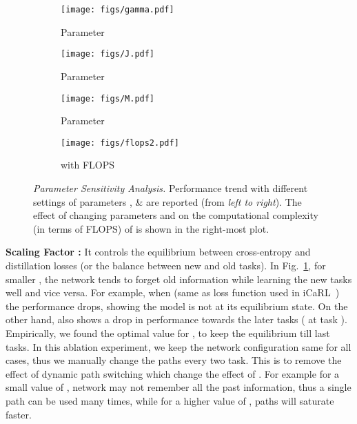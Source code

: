\begin{figure*}[!htb]
    \centering
    \begin{subfigure}{.245\textwidth}
        \centering
            \texttt{[image: figs/gamma.pdf]}
        \caption{Parameter }\label{fig:gamma}
    \end{subfigure}
    \begin{subfigure}{.245\textwidth}
        \centering
        \texttt{[image: figs/J.pdf]}
        \caption{Parameter }\label{fig:j_var}
    \end{subfigure}
    \begin{subfigure}{.245\textwidth}
        \centering
        \texttt{[image: figs/M.pdf]}
        \caption{Parameter }\label{fig:m_var}
    \end{subfigure}
    \begin{subfigure}{.245\textwidth}
        \centering
        \texttt{[image: figs/flops2.pdf]}
        \caption{ with FLOPS}\label{fig:flops}
    \end{subfigure}
   
    \caption{\emph{Parameter Sensitivity Analysis.}  Performance trend with different settings of parameters ,  \&  are reported (from \textit{left to right}). The effect of changing parameters  and  on the computational complexity (in terms of FLOPS) of \ours{} is shown in the right-most plot. }
    \label{fig:ablation}
\end{figure*}

\textbf{Scaling Factor :} It controls the equilibrium between cross-entropy and distillation losses (or the balance between new and old tasks). In Fig.~\ref{fig:gamma}, for smaller , the network tends to forget old information while learning the new tasks well and vice versa. For example, when  (same as loss function used in iCaRL~\cite{rebuffi2017icarl}) the performance drops, showing the model is not at its equilibrium state. On the other hand,  also shows a drop in performance towards the later tasks ( at task ). Empirically, we found the optimal value for , to keep the equilibrium till last tasks. In this ablation experiment, we keep the network configuration same for all cases, thus we manually change the paths every two task. This is to remove the effect of dynamic path switching which change the effect of . For example for a small value of , network may not remember all the past information, thus a single path can be used many times, while for a higher value of , paths will saturate faster. 


